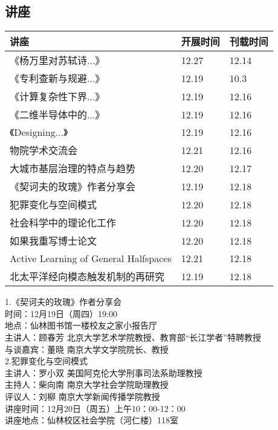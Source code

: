 \documentclass[letterpaper, 12pt]{article}
\begin{document}
\begin{multicols}{2}

\section{讲座}
\begin{tabularx}{0.5\textwidth}{|X|X|X|}
    \hline
    讲座 & 开展时间 & 刊载时间\\
    \hline\hline
《杨万里对苏轼诗...》 & 12.27 & 12.14\\\hline
《专利查新与规避...》 & 12.19 & 10.3\\\hline
《计算复杂性下界...》 & 12.19 & 12.16\\\hline
《二维半导体中的...》 & 12.19 & 12.16\\\hline
《Designing...》 & 12.19 & 12.16\\\hline
物院学术交流会 & 12.21 & 12.16\\\hline
大城市基层治理的特点与趋势 & 12.20 & 12.17\\\hline
《契诃夫的玫瑰》作者分享会 & 12.19 & 12.18\\\hline
犯罪变化与空间模式 & 12.20 & 12.18\\\hline
社会科学中的理论化工作 & 12.20 & 12.18\\\hline
如果我重写博士论文 & 12.20 & 12.18\\\hline
Active Learning of General Halfspaces & 12.21 & 12.18\\\hline
北太平洋经向模态触发机制的再研究 & 12.19 & 12.18\\\hline
\end{tabularx}

1.《契诃夫的玫瑰》作者分享会\\
时间：12月19日（周四）19:00\\
地点：仙林图书馆一楼校友之家小报告厅\\
主讲人：顾春芳 北京大学艺术学院教授、教育部“长江学者”特聘教授\\
与谈嘉宾：董晓 南京大学文学院院长、教授\\

2.犯罪变化与空间模式\\
主讲人：罗小双 美国阿克伦大学刑事司法系助理教授\\
主持人：柴向南 南京大学社会学院助理教授\\
评议人：刘柳 南京大学新闻传播学院教授\\
讲座时间：12月20日（周五）上午10：00-12：00\\
讲座地点：仙林校区社会学院（河仁楼）118室\\


\end{multicols}
\end{document}
